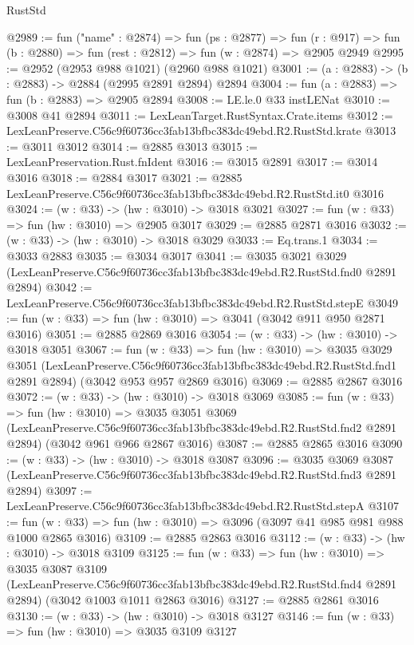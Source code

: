 \begin{lexlean}{RustStd}
\begin{coremodule}
@2989 := fun ("name" : @2874) =>
  fun (ps : @2877) =>
  fun (r : @917) => fun (b : @2880) => fun (rest : @2812) => fun (w : @2874) => @2905 @2949
@2995 := @2952 (@2953 @988 @1021) (@2960 @988 @1021)
@3001 := (a : @2883) -> (b : @2883) -> @2884 (@2995 @2891 @2894) @2894
@3004 := fun (a : @2883) => fun (b : @2883) => @2905 @2894
@3008 := LE.le.{0} @33 instLENat
@3010 := @3008 @41 @2894
@3011 := LexLeanTarget.RustSyntax.Crate.items
@3012 := LexLeanPreserve.C56c9f60736cc3fab13bfbc383dc49ebd.R2.RustStd.krate
@3013 := @3011 @3012
@3014 := @2885 @3013
@3015 := LexLeanPreservation.Rust.fnIdent
@3016 := @3015 @2891
@3017 := @3014 @3016
@3018 := @2884 @3017
@3021 := @2885 LexLeanPreserve.C56c9f60736cc3fab13bfbc383dc49ebd.R2.RustStd.it0 @3016
@3024 := (w : @33) -> (hw : @3010) -> @3018 @3021
@3027 := fun (w : @33) => fun (hw : @3010) => @2905 @3017
@3029 := @2885 @2871 @3016
@3032 := (w : @33) -> (hw : @3010) -> @3018 @3029
@3033 := Eq.trans.{1}
@3034 := @3033 @2883
@3035 := @3034 @3017
@3041 := @3035
    @3021
    @3029
    (LexLeanPreserve.C56c9f60736cc3fab13bfbc383dc49ebd.R2.RustStd.fnd0 @2891 @2894)
@3042 := LexLeanPreserve.C56c9f60736cc3fab13bfbc383dc49ebd.R2.RustStd.stepE
@3049 := fun (w : @33) => fun (hw : @3010) => @3041 (@3042 @911 @950 @2871 @3016)
@3051 := @2885 @2869 @3016
@3054 := (w : @33) -> (hw : @3010) -> @3018 @3051
@3067 := fun (w : @33) =>
  fun (hw : @3010) =>
  @3035
    @3029
    @3051
    (LexLeanPreserve.C56c9f60736cc3fab13bfbc383dc49ebd.R2.RustStd.fnd1 @2891 @2894)
    (@3042 @953 @957 @2869 @3016)
@3069 := @2885 @2867 @3016
@3072 := (w : @33) -> (hw : @3010) -> @3018 @3069
@3085 := fun (w : @33) =>
  fun (hw : @3010) =>
  @3035
    @3051
    @3069
    (LexLeanPreserve.C56c9f60736cc3fab13bfbc383dc49ebd.R2.RustStd.fnd2 @2891 @2894)
    (@3042 @961 @966 @2867 @3016)
@3087 := @2885 @2865 @3016
@3090 := (w : @33) -> (hw : @3010) -> @3018 @3087
@3096 := @3035
    @3069
    @3087
    (LexLeanPreserve.C56c9f60736cc3fab13bfbc383dc49ebd.R2.RustStd.fnd3 @2891 @2894)
@3097 := LexLeanPreserve.C56c9f60736cc3fab13bfbc383dc49ebd.R2.RustStd.stepA
@3107 := fun (w : @33) => fun (hw : @3010) => @3096 (@3097 @41 @985 @981 @988 @1000 @2865 @3016)
@3109 := @2885 @2863 @3016
@3112 := (w : @33) -> (hw : @3010) -> @3018 @3109
@3125 := fun (w : @33) =>
  fun (hw : @3010) =>
  @3035
    @3087
    @3109
    (LexLeanPreserve.C56c9f60736cc3fab13bfbc383dc49ebd.R2.RustStd.fnd4 @2891 @2894)
    (@3042 @1003 @1011 @2863 @3016)
@3127 := @2885 @2861 @3016
@3130 := (w : @33) -> (hw : @3010) -> @3018 @3127
@3146 := fun (w : @33) =>
  fun (hw : @3010) =>
  @3035
    @3109
    @3127

\end{coremodule}
\end{lexlean}
